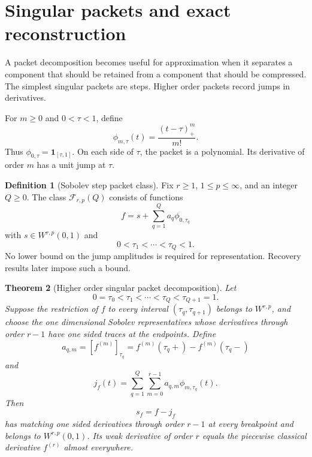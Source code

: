 \documentclass[11pt,a4paper]{article}
\newtheorem{theorem}{Theorem}[section]
\theoremstyle{definition}
\newtheorem{definition}[theorem]{Definition}
\theoremstyle{remark}
\newcommand{\Fcal}{\mathcal F}
\newcommand{\one}{\mathbf 1}
\newcommand{\jump}[1]{\left[#1\right]}
\begin{document}
\section{Singular packets and exact reconstruction}\label{extension:section:07}\label{sec:singular_packets}

A packet decomposition becomes useful for approximation when it separates a component that should be retained from a component that should be compressed. The simplest singular packets are steps. Higher order packets record jumps in derivatives.

For \(m\geq0\) and \(0<\tau<1\), define
\[
\phi_{m,\tau}(t)
=
\frac{(t-\tau)_+^m}{m!}.
\]
Thus \(\phi_{0,\tau}=\one_{[\tau,1]}\). On each side of \(\tau\), the packet is a polynomial. Its derivative of order \(m\) has a unit jump at \(\tau\).

\begin{definition}[Sobolev step packet class]\label{def:step_packet_class}
Fix \(r\geq1\), \(1\leq p\leq\infty\), and an integer \(Q\geq0\). The class \(\Fcal_{r,p}(Q)\) consists of functions
\[
f=s+\sum_{q=1}^{Q}a_q\phi_{0,\tau_q}
\]
with \(s\in W^{r,p}(0,1)\) and
\[
0<\tau_1<\cdots<\tau_Q<1.
\]
No lower bound on the jump amplitudes is required for representation. Recovery results later impose such a bound.
\end{definition}

\begin{theorem}[Higher order singular packet decomposition]\label{thm:higher_order_packet_decomposition}
Let
\[
0=\tau_0<\tau_1<\cdots<\tau_Q<\tau_{Q+1}=1.
\]
Suppose the restriction of \(f\) to every interval \((\tau_q,\tau_{q+1})\) belongs to \(W^{r,p}\), and choose the one dimensional Sobolev representatives whose derivatives through order \(r-1\) have one sided traces at the endpoints. Define
\[
a_{q,m}
=
\jump{f^{(m)}}_{\tau_q}
=
f^{(m)}(\tau_q+)-f^{(m)}(\tau_q-)
\]
and
\[
j_f(t)
=
\sum_{q=1}^{Q}\sum_{m=0}^{r-1}a_{q,m}\phi_{m,\tau_q}(t).
\]
Then
\[
s_f=f-j_f
\]
has matching one sided derivatives through order \(r-1\) at every breakpoint and belongs to \(W^{r,p}(0,1)\). Its weak derivative of order \(r\) equals the piecewise classical derivative \(f^{(r)}\) almost everywhere.
\end{theorem}
\end{document}
